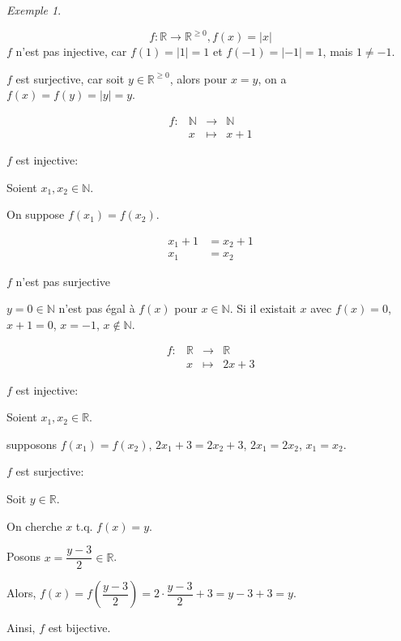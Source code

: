 \documentclass{report}
\newcommand*{\abs}[1]{\left| #1 \right|}
\newcommand*{\gte}{\geqslant}
\newcommand*{\reels}{\mathbb{R}}
\newcommand*{\naturels}{\mathbb{N}}
\theoremstyle{definition}
\theoremstyle{remark}
\newtheorem*{exem}{Exemple}
\begin{document}
	\begin{exem}~
		
		\begin{ulist}
			\item 
			\[
			f:\reels \to \reels^{\gte0}, f(x)=\abs{x}
			\]
			$f$ n'est pas injective, car $f(1)=\abs{1}=1$ et $f(-1)=\abs{-1}=1$, mais $1 \neq -1$.
			
			$f$ est surjective, car soit $y \in \reels^{\gte0}$, alors pour $x=y$, on a $f(x)=f(y)=\abs{y}=y$.
			
			\item 
			\[
			\begin{array}{rrcl}
				f:&\naturels&\to&\naturels\\
				&x&\mapsto&x+1
			\end{array}
			\]
			
			$f$ est injective:
			
			Soient $x_1,x_2 \in \naturels$.
			
			On suppose $f(x_1)=f(x_2)$.
			
			\begin{align*}
				x_1+1&= x_2+1\\
				x_1&= x_2
			\end{align*}
			
			$f$ n'est pas surjective
			
			$y=0\in\naturels$ n'est pas \'egal \`a $f(x)$ pour $x\in\naturels$. Si il existait $x$ avec $f(x)=0$, $x+1=0$, $x=-1$, $x \not\in \naturels$.
			
			\item 
			\[
			\begin{array}{rrcl}
				f:&\reels&\to&\reels\\
				&x&\mapsto&2x+3
			\end{array}
			\]
			
			$f$ est injective:
			
			Soient $x_1,x_2 \in \reels$.
			
			supposons $f(x_1)=f(x_2)$, $2x_1+3=2x_2+3$, $2x_1=2x_2$, $x_1=x_2$.
			
			$f$ est surjective:
			
			Soit $y \in \reels$.
			
			On cherche $x$ t.q. $f(x)=y$.
			
			Posons $x=\dfrac{y-3}{2} \in \reels$.
			
			Alors, $f(x) = f\left( \dfrac{y-3}{2} \right) = 2 \cdot  \dfrac{y-3}{2} + 3 = y-3+3 = y$.
			
			Ainsi, $f$ est bijective.
			

\end{ulist}
\end{exem}
\end{document}
